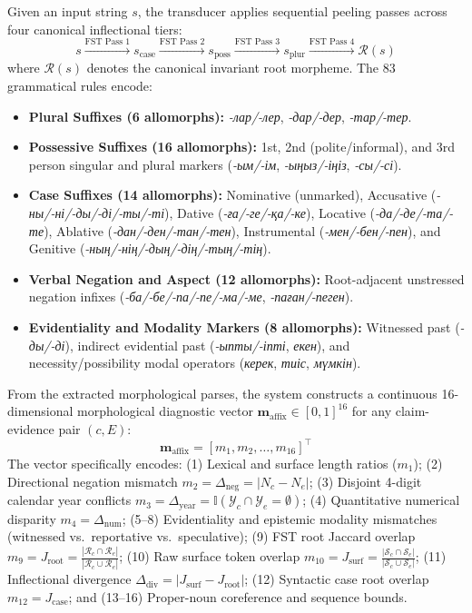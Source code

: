 Given an input string $s$, the transducer applies sequential peeling passes across four canonical inflectional tiers:
\begin{equation}
    s \xrightarrow{\text{FST Pass 1}} s_{\text{case}} \xrightarrow{\text{FST Pass 2}} s_{\text{poss}} \xrightarrow{\text{FST Pass 3}} s_{\text{plur}} \xrightarrow{\text{FST Pass 4}} \mathcal{R}(s)
\end{equation}
where $\mathcal{R}(s)$ denotes the canonical invariant root morpheme. The 83 grammatical rules encode:
\begin{itemize}[leftmargin=*, nosep]
    \item \textbf{Plural Suffixes (6 allomorphs):} \textit{-лар/-лер}, \textit{-дар/-дер}, \textit{-тар/-тер}.
    \item \textbf{Possessive Suffixes (16 allomorphs):} 1st, 2nd (polite/informal), and 3rd person singular and plural markers (\textit{-ым/-ім}, \textit{-ыңыз/-іңіз}, \textit{-сы/-сі}).
    \item \textbf{Case Suffixes (14 allomorphs):} Nominative (unmarked), Accusative (\textit{-ны/-ні/-ды/-ді/-ты/-ті}), Dative (\textit{-ға/-ге/-қа/-ке}), Locative (\textit{-да/-де/-та/-те}), Ablative (\textit{-дан/-ден/-тан/-тен}), Instrumental (\textit{-мен/-бен/-пен}), and Genitive (\textit{-ның/-нің/-дың/-дің/-тың/-тің}).
    \item \textbf{Verbal Negation and Aspect (12 allomorphs):} Root-adjacent unstressed negation infixes (\textit{-ба/-бе/-па/-пе/-ма/-ме}, \textit{-паған/-пеген}).
    \item \textbf{Evidentiality and Modality Markers (8 allomorphs):} Witnessed past (\textit{-ды/-ді}), indirect evidential past (\textit{-ыпты/-іпті}, \textit{екен}), and necessity/possibility modal operators (\textit{керек}, \textit{тиіс}, \textit{мүмкін}).
\end{itemize}

From the extracted morphological parses, the system constructs a continuous 16-dimensional morphological diagnostic vector $\mathbf{m}_{\text{affix}} \in [0, 1]^{16}$ for any claim-evidence pair $(c, E)$:
\begin{equation}
    \mathbf{m}_{\text{affix}} = \left[ m_1, m_2, \dots, m_{16} \right]^\top
\end{equation}
The vector specifically encodes: (1) Lexical and surface length ratios ($m_1$); (2) Directional negation mismatch $m_2 = \Delta_{\text{neg}} = |N_c - N_e|$; (3) Disjoint 4-digit calendar year conflicts $m_3 = \Delta_{\text{year}} = \mathbb{I}(\mathcal{Y}_c \cap \mathcal{Y}_e = \emptyset)$; (4) Quantitative numerical disparity $m_4 = \Delta_{\text{num}}$; (5--8) Evidentiality and epistemic modality mismatches (witnessed vs.\ reportative vs.\ speculative); (9) FST root Jaccard overlap $m_9 = J_{\text{root}} = \frac{|\mathcal{R}_c \cap \mathcal{R}_e|}{|\mathcal{R}_c \cup \mathcal{R}_e|}$; (10) Raw surface token overlap $m_{10} = J_{\text{surf}} = \frac{|\mathcal{S}_c \cap \mathcal{S}_e|}{|\mathcal{S}_c \cup \mathcal{S}_e|}$; (11) Inflectional divergence $\Delta_{\text{div}} = |J_{\text{surf}} - J_{\text{root}}|$; (12) Syntactic case root overlap $m_{12} = J_{\text{case}}$; and (13--16) Proper-noun coreference and sequence bounds.

